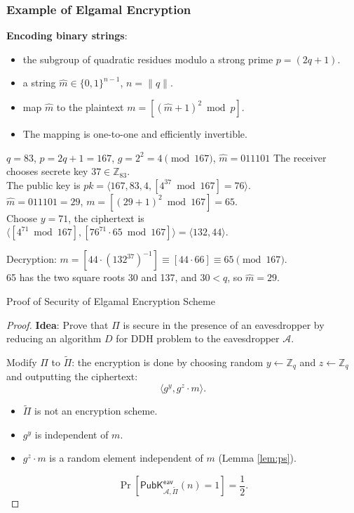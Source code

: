 \begin{frame}\frametitle{Example of Elgamal Encryption}
\textbf{Encoding binary strings}:
\begin{itemize}
\item the subgroup of quadratic residues modulo a strong prime $p = (2q+1)$.
\item a string $\hat{m} \in \{0,1\}^{n-1}$, $n = \|q\|$.
\item map $\hat{m}$ to the plaintext $m = [(\hat{m}+1)^2 \bmod p]$.
\item The mapping is one-to-one and efficiently invertible.
\end{itemize}
\begin{exampleblock}{$q=83$, $p=2q+1=167$, $g=2^2=4 \pmod{167}$, $\hat{m}=011101$}
The receiver chooses secrete key $37 \in \mathbb{Z}_{83}$.\\
The public key is $pk=\langle 167,83,4,[4^{37} \bmod 167]=76\rangle$.\\
$\hat{m}=011101=29$, $m = [(29+1)^2 \bmod 167] = 65$.\\
Choose $y=71$, the ciphertext is $\langle [4^{71} \bmod 167], [76^{71}\cdot 65 \bmod 167]\rangle = \langle 132,44\rangle$.
\newline

Decryption: $m= [44\cdot (132^{37})^{-1}] \equiv [44\cdot 66] \equiv 65 \pmod{167}$.\\
65 has the two square roots 30 and 137, and $30 < q$, so $\hat{m}=29$.
\end{exampleblock}
\end{frame}
\begin{frame}{Proof of Security of Elgamal Encryption Scheme}
\begin{proof}
\textbf{Idea}: Prove that $\Pi$ is secure in the presence of an eavesdropper by reducing an algorithm $D$ for DDH problem to the eavesdropper $\mathcal{A}$.
\newline

Modify $\Pi$ to $\tilde{\Pi}$: the encryption is done by choosing random $y \gets \mathbb{Z}_q$ and $z \gets \mathbb{Z}_q$ and outputting the ciphertext:
\[ \langle g^y, g^z\cdot m\rangle.\]
\begin{itemize}
\item $\tilde{\Pi}$ is not an encryption scheme.
\item $g^y$ is independent of $m$.
\item $g^z\cdot m$ is a random element independent of $m$ (Lemma \ref{lem:ps}).
\end{itemize}
\[ \Pr\left[\mathsf{PubK}^{\mathsf{eav}}_{\mathcal{A},\tilde{\Pi}}(n)=1\right] = \frac{1}{2}.\]
\end{proof}
\end{frame}
